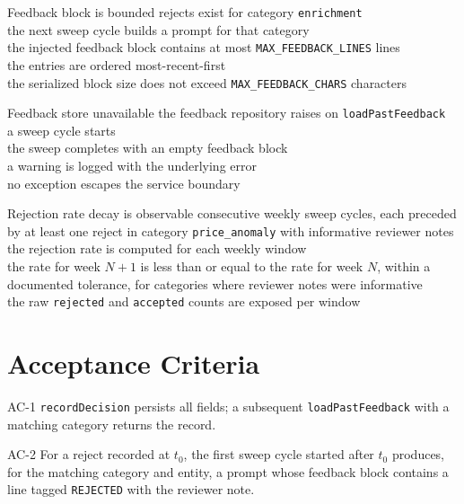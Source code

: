\begin{scenario}{Feedback block is bounded}
 rejects exist for category \texttt{enrichment} \\
\When the next sweep cycle builds a prompt for that category \\
\Then the injected feedback block contains at most \texttt{MAX\_FEEDBACK\_LINES} lines \\
\And the entries are ordered most-recent-first \\
\And the serialized block size does not exceed \texttt{MAX\_FEEDBACK\_CHARS} characters
\end{scenario}

\begin{scenario}{Feedback store unavailable}
\Given the feedback repository raises on \texttt{loadPastFeedback} \\
\When a sweep cycle starts \\
\Then the sweep completes with an empty feedback block \\
\And a warning is logged with the underlying error \\
\And no exception escapes the service boundary
\end{scenario}

\begin{scenario}{Rejection rate decay is observable}
 consecutive weekly sweep cycles, each preceded by at least one reject in category \texttt{price\_anomaly} with informative reviewer notes \\
\When the rejection rate is computed for each weekly window \\
\Then the rate for week $N+1$ is less than or equal to the rate for week $N$, within a documented tolerance, for categories where reviewer notes were informative \\
\And the raw \texttt{rejected} and \texttt{accepted} counts are exposed per window
\end{scenario}

\section{Acceptance Criteria}

\begin{ac}{AC-1}
\texttt{recordDecision} persists all fields; a subsequent \texttt{loadPastFeedback} with a matching category returns the record.
\end{ac}

\begin{ac}{AC-2}
For a reject recorded at $t_0$, the first sweep cycle started after $t_0$ produces, for the matching category and entity, a prompt whose feedback block contains a line tagged \texttt{REJECTED} with the reviewer note.
\end{ac}

